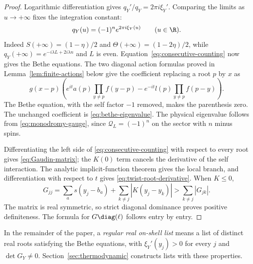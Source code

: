 \begin{proof}
Logarithmic differentiation gives $q_Y'/q_Y=2\pi i\xi_Y'$.
Comparing the limits as $u\to+\infty$ fixes the integration constant:
\begin{equation}\label{eq:q-counting-phase}
 q_Y(u)=(-1)^n e^{2\pi i\xi_Y(u)}\qquad(u\in\R).
\end{equation}
Indeed $S(+\infty)=(1-\eta)/2$ and
$\Theta(+\infty)=(1-2\eta)/2$, while
$q_Y(+\infty)=e^{-i\lambda L+2i\lambda n}$ and $L$ is even.
Equation~\eqref{eq:consecutive-counting} now gives the Bethe equations.
The two diagonal action formulas proved in
Lemma~\ref{lem:finite-actions} below give the coefficient replacing a
root $p$ by $x$ as
\[
 g(x-p)\left(
 e^{it}a(p)\prod_{y\ne p}f(y-p)
 -e^{-it}l(p)\prod_{y\ne p}f(p-y)\right).
\]
The Bethe equation, with the self factor $-1$ removed, makes the
parenthesis zero.  The unchanged coefficient is
\eqref{eq:bethe-eigenvalue}.  The physical eigenvalue follows from
\eqref{eq:monodromy-gauge}, since $\mathcal Q_L=(-1)^n$ on the sector
with $n$ minus spins.

Differentiating the left side of
\eqref{eq:consecutive-counting} with respect to every root gives
\eqref{eq:Gaudin-matrix}; the $K(0)$ term cancels the derivative of the
self interaction.  The analytic implicit-function theorem gives the
local branch, and differentiation with respect to $t$ gives
\eqref{eq:twist-root-derivative}.  When $K\le0$,
\[
 G_{jj}=\sum_a s(y_j-b_a)+\sum_{k\ne j}|K(y_j-y_k)|
       >\sum_{k\ne j}|G_{jk}|.
\]
The matrix is real symmetric, so strict diagonal dominance proves
positive definiteness.  The formula for $G\diag(\ell)$ follows
entry by entry.
\end{proof}

In the remainder of the paper, a \emph{regular real on-shell list}
means a list of distinct real roots satisfying the Bethe equations,
with $\xi_Y'(y_j)>0$ for every $j$ and $\det G_Y\ne0$.
Section~\ref{sec:thermodynamic} constructs lists with these properties.

